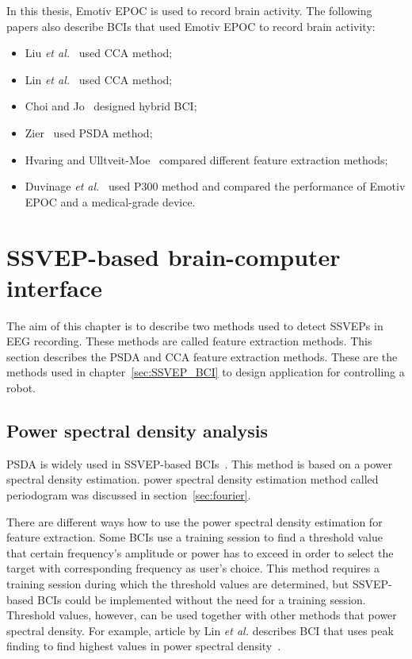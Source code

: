 In this thesis, Emotiv EPOC is used to record brain activity. The following papers also describe \glspl{BCI} that used Emotiv EPOC to record brain activity:
\begin{itemize}
	\item Liu \textit{et al.}~\cite{emotiv_11hz} used \gls{CCA} method;
	\item Lin \textit{et al.}~\cite{emotiv_walking} used \gls{CCA} method;
	\item Choi and Jo~\cite{emotiv_hybrid} designed hybrid \gls{BCI};
	\item Zier~\cite{emotiv_psda} used \gls{PSDA} method;
	\item Hvaring and Ulltveit-Moe~\cite{emotiv_comparison} compared different \gls{feature extraction} methods;
	\item Duvinage \textit{et al.}~\cite{emotiv_p300_comp} used P300 method and compared the performance of Emotiv EPOC and a medical-grade device.
\end{itemize}


\section{SSVEP-based brain-computer interface}
\label{sec:SSVEP_detection}
The aim of this chapter is to describe two methods used to detect \glspl{SSVEP} in \gls{EEG} recording. These methods are called \gls{feature extraction} methods. This section describes the \gls{PSDA} and \gls{CCA} \gls{feature extraction} methods. These are the methods used in chapter~\ref{sec:SSVEP_BCI} to design application for controlling a robot. 

\subsection{Power spectral density analysis}

\Gls{PSDA} is widely used in \gls{SSVEP}-based \glspl{BCI}~\cite{bin2009cca}. This method is based on a \gls{power spectral density} estimation. \Gls{power spectral density} estimation method called \gls{periodogram} was discussed in section~\ref{sec:fourier}.

There are different ways how to use the \gls{power spectral density} estimation for \gls{feature extraction}. Some \glspl{BCI} use a training session to find a threshold value that certain frequency's amplitude or power has to exceed in order to select the \gls{target} with corresponding frequency as user's choice. This method requires a training session during which the threshold values are determined, but \gls{SSVEP}-based \glspl{BCI} could be implemented without the need for a training session. Threshold values, however, can be used together with other methods that \gls{power spectral density}. For example, article by Lin \textit{et al.} describes \gls{BCI} that uses peak finding to find highest values in \gls{power spectral density}~\cite{cca_lin}.

